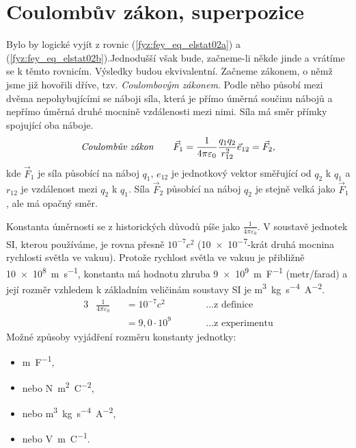   \section{Coulombův zákon, superpozice}  
    \cite[s.~65]{Feynman02} Bylo by logické vyjít z rovnic (\ref{fyz:fey_eq_elstat02a}) a 
    (\ref{fyz:fey_eq_elstat02b}).Jednodušší však bude, začneme-li někde jinde a vrátíme se k těmto 
    rovnicím. Výsledky budou ekvivalentní. Začneme zákonem, o němž jsme již hovořili dříve, tzv. 
    \emph{Coulombovým zákonem}. Podle něho působí mezi dvěma nepohybujícími se náboji síla, která je 
    přímo úměrná součinu nábojů a nepřímo úměrná druhé mocnině vzdálenosti mezi nimi. Síla má směr 
    přímky spojující oba náboje.
    \begin{equation}\label{fyz:fey_eq_elstat09}
     \text{\emph{Coulombův zákon}} \qquad 
       \vec{F}_1=\frac{1}{4\pi\varepsilon_0}\frac{q_1q_2}{r_{12}^2}\vec{e}_{12} = \vec{F}_2,
    \end{equation}
    kde \(\vec{F}_1\) je síla působící na náboj \(q_1\), \(e_{12}\) je jednotkový vektor směřující 
    od \(q_2\) k \(q_1\) a \(r_{12}\) je vzdálenost mezi \(q_2\) k \(q_1\). Síla \(\vec{F}_2\) 
    působící na náboj \(q_2\) je stejně velká jako \(\vec{F}_1\), ale má opačný směr.
     
    Konstanta úměrnosti se z historických důvodů píše jako \(\frac{1}{4\pi\varepsilon_0}\). V 
    soustavě jednotek SI, kterou používáme, je rovna přesně \(10^{-7}c^2\) (\num{10e-7}-krát druhá 
    mocnina rychlosti světla ve vakuu). Protože rychlost světla ve vakuu je přibližně 
    \SI{10e8}{\meter\per\second}, konstanta má hodnotu zhruba \SI{9e9}{\meter\per\farad} 
    (metr/farad) a její rozměr vzhledem k základním veličinám soustavy SI je 
    \si{\cubic\meter\kilogram\second^{-4}\ampere^{-2}}.
    \begin{alignat*}{3}
     &\frac{1}{4\pi\varepsilon_0} &&= 10^{-7}c^2   \qquad && \ldots \text{z definice}     \\
     &                            &&= 9,0\cdot10^9 \qquad && \ldots \text{z experimentu} 
    \end{alignat*}
    Možné způsoby vyjádření rozměru konstanty jednotky: 
    \begin{itemize}
     \setlength{\itemsep}{0cm}%
     \setlength{\parskip}{0em}%
       \item \si{\meter\per\farad},    
       \item nebo \si{\newton\square\meter\per\square\coulomb},    
       \item nebo \si{\cubic\meter\kilogram\second^{-4}\ampere^{-2}},
       \item nebo \si{\volt\meter\per\coulomb}.
    \end{itemize}
    
